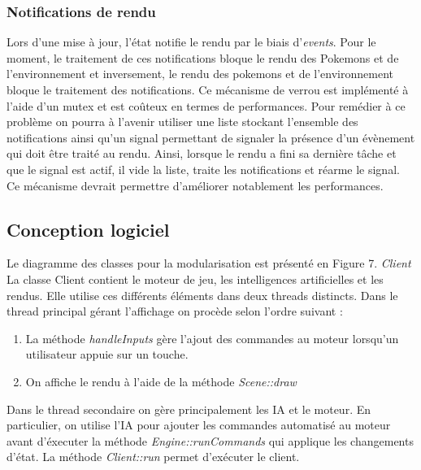 \documentclass[a4paper,12pt]{article}
\begin{document}
\subsubsection{Notifications de rendu}   
    Lors d'une mise à jour, l'état notifie le rendu par le biais d'\emph{events}. Pour le moment, le traitement de ces notifications bloque le rendu des Pokemons et de l'environnement et inversement, le rendu des pokemons et de l'environnement bloque le traitement des notifications. Ce mécanisme de verrou est implémenté à l'aide d'un mutex et est coûteux en termes de performances. Pour remédier à ce problème on pourra à l'avenir utiliser une liste stockant l'ensemble des notifications ainsi qu'un signal permettant de signaler la présence d'un évènement qui doit être traité au rendu. Ainsi, lorsque le rendu a fini sa dernière tâche et que le signal est actif, il vide la liste, traite les notifications et réarme le signal. Ce mécanisme devrait permettre d'améliorer notablement les performances.
    \clearpage
    \subsection{Conception logiciel}
    Le diagramme des classes pour la modularisation est présenté en Figure 7.
    \emph{Client} La classe Client contient le moteur de jeu, les intelligences artificielles et les rendus. Elle utilise ces différents éléments dans deux threads distincts. Dans le thread principal gérant l'affichage on procède selon l'ordre suivant :
\begin{enumerate}
\item La méthode \emph{handleInputs} gère l'ajout des commandes au moteur lorsqu'un utilisateur appuie sur un touche.
\item On affiche le rendu à l'aide de la méthode \emph{Scene::draw}
\end{enumerate}

 Dans le thread secondaire on gère principalement les IA et le moteur. En particulier, on  utilise l'IA pour ajouter les commandes automatisé au moteur avant d'éxecuter la méthode \emph{Engine::runCommands} qui applique les changements d'état.
    La méthode \emph{Client::run} permet d'exécuter le client. 
    
\end{document}
